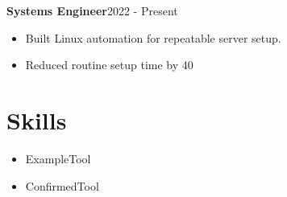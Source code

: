 \documentclass{article}
\newcommand{\worktitle}[2]{\textbf{#1}\hfill #2}
\begin{document}
\worktitle{Systems Engineer}{2022 - Present}
\begin{itemize}
\item Built Linux automation for repeatable server setup. %
\item Reduced routine setup time by 40%
\end{itemize}
\section*{Skills}
\begin{itemize}
\item ExampleTool
\item ConfirmedTool
\end{itemize}
\end{document}
